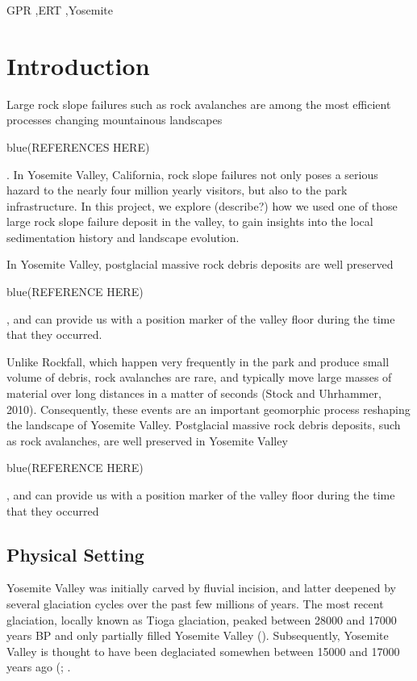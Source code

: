 \documentclass[5p]{elsarticle}
\newcommand{\COMON}{\begin{color}{blue}}
\newcommand{\COMOFF}{\end{color}}
\begin{document}
\begin{frontmatter}
\begin{abstract}
									\end{abstract}

					\begin{keyword}
GPR \sep ERT \sep Yosemite
					\end{keyword}

	\end{frontmatter}







\section{Introduction}

Large rock slope failures such as rock avalanches are among the most efficient processes changing mountainous landscapes \COMON (REFERENCES HERE) \COMOFF. In Yosemite Valley, California, rock slope failures not only poses a serious hazard to the nearly four million yearly visitors, but also to the park infrastructure. In this project, we explore (describe?) how we used one of those large rock slope failure deposit in the valley, to gain insights into the local sedimentation history and landscape evolution. 

In Yosemite Valley, postglacial massive rock debris deposits  are well preserved \COMON (REFERENCE HERE) \COMOFF, and can provide us with a position marker of the valley floor during the time that they occurred. 

Unlike Rockfall, which happen very frequently in the park and produce small volume of debris, rock avalanches are rare, and typically move large masses of material over long distances in a matter of seconds (Stock and Uhrhammer, 2010). Consequently, these events are an important geomorphic process reshaping the landscape of Yosemite Valley. Postglacial massive rock debris deposits, such as rock avalanches,  are well preserved in Yosemite Valley \COMON (REFERENCE HERE) \COMOFF, and can provide us with a position marker of the valley floor during the time that they occurred


\subsection{Physical Setting}

Yosemite Valley was initially carved by fluvial incision, and latter deepened by several glaciation cycles over the past few millions of years. The most recent glaciation, locally known as Tioga glaciation, peaked between \num{28000} and \num{17000} years BP and only partially filled  Yosemite Valley (\cite{huber1987geologic}). Subsequently, Yosemite Valley is thought to have been deglaciated somewhen between \num{15000} and \num{17000} years ago (\cite{huber1987geologic};  \cite{Wieczorek+1996}.
\end{document}
